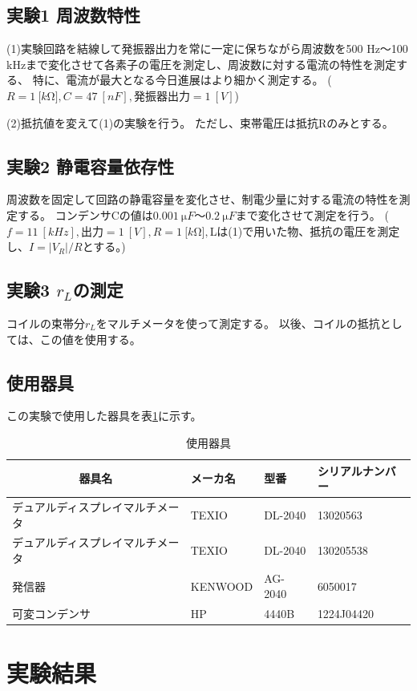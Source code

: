 \documentclass[11pt,a4paper,fleqn]{jsarticle}
\begin{document}
\subsection{実験1 周波数特性}
(1)実験回路を結線して発振器出力を常に一定に保ちながら周波数を500 Hz～100 kHzまで変化させて各素子の電圧を測定し、周波数に対する電流の特性を測定する、
特に、電流が最大となる今日進展はより細かく測定する。
($R=1\ \si{[k\ohm]}, C=47\ \si{[nF]}, 発振器出力=1\ \si{[V]}$)

(2)抵抗値を変えて(1)の実験を行う。
ただし、束帯電圧は抵抗Rのみとする。
\subsection{実験2 静電容量依存性}
周波数を固定して回路の静電容量を変化させ、制電少量に対する電流の特性を測定する。
コンデンサCの値は$0.001\ \si{\micro F}～0.2\ \si{\micro F}$まで変化させて測定を行う。
($f=11\ \si{[kHz]}, 出力=1\ \si{[V]}, R=1\ \si{[k\ohm]},$Lは(1)で用いた物、抵抗の電圧を測定し、$I=|V_{R}|/R$とする。)
\subsection{実験3 $r_{L}$の測定}
コイルの束帯分$r_{L}$をマルチメータを使って測定する。
以後、コイルの抵抗としては、この値を使用する。

\subsection{使用器具}
この実験で使用した器具を表\ref{cal:item}に示す。
\begin{table}[!h]
\centering
\caption{使用器具}
\label{cal:item}
\begin{tabular}{|l|l|l|l|}
\hline
\multicolumn{1}{|c|}{器具名} & メーカ名    & 型番      & シリアルナンバー   \\ \hline
デュアルディスプレイマルチメータ          & TEXIO   & DL-2040 & 13020563   \\ \hline
デュアルディスプレイマルチメータ          & TEXIO   & DL-2040 & 130205538  \\ \hline
発信器                       & KENWOOD & AG-2040 & 6050017    \\ \hline
可変コンデンサ                   & HP      & 4440B   & 1224J04420 \\ \hline
\end{tabular}
\end{table}
%
\section{実験結果}
\end{document}
